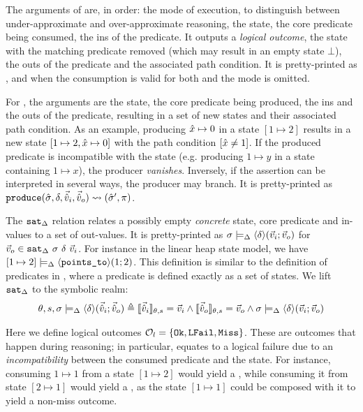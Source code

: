 The arguments of \consume{} are, in order: the mode of execution, to distinguish between under-approximate and over-approximate reasoning, the state, the core predicate being consumed, the ins of the predicate. It outputs a \emph{logical outcome}, the state with the matching predicate removed (which may result in an empty state $\bot$), the outs of the predicate and the associated path condition. It is pretty-printed as , and when the consumption is valid for both \OX{} and \UX{} the mode is omitted.

For \produce{}, the arguments are the state, the core predicate being produced, the ins and the outs of the predicate, resulting in a set of new states and their associated path condition. As an example, producing $\hat{x} \mapsto 0$ in a state $[1 \mapsto 2]$ results in a new state $[1\mapsto 2, \hat{x} \mapsto 0]$ with the path condition $[\hat{x} \neq 1]$. If the produced predicate is incompatible with the state (e.g. producing $1 \mapsto y$ in a state containing $1 \mapsto x$), the producer \emph{vanishes}. Inversely, if the assertion can be interpreted in several ways, the producer may branch. It is pretty-printed as $\texttt{produce}(\hat{\sigma},\delta,\vec{\hat{v}}_i,\vec{\hat{v}}_o)\rightsquigarrow (\hat{\sigma}', \pi)$.

The $\texttt{sat}_{\Delta}$ relation relates a possibly empty \emph{concrete} state, core predicate and in-values to a set of out-values. It is pretty-printed as $\sigma \models_{\Delta} \left<\delta\right>\!(\vec{v}_i;\vec{v}_o)$ for $\vec{v}_o \in \texttt{sat}_{\Delta}~\sigma~\delta~\vec{v}_i$. For instance in the linear heap state model, we have $[ 1 \mapsto 2 ] \models_{\Delta} \left<\texttt{points\_to}\right>\!(1;2)$. This definition is similar to the definition of predicates in \cite{abstractseplogic,localreasoning}, where a predicate is defined exactly as a set of states. We lift $\texttt{sat}_{\Delta}$ to the symbolic realm:
\begin{align*}
	\theta,s,\sigma\models_{\Delta} \left<\delta\right>\!(\vec{\hat{v}}_i;\vec{\hat{v}}_o) \triangleq \llbracket\vec{\hat{v}}_i\rrbracket_{\theta,s}=\vec{v}_i \land \llbracket\vec{\hat{v}}_o\rrbracket_{\theta,s}=\vec{v}_o \land \sigma\models_{\Delta} \left<\delta\right>\!(\vec{v}_i;\vec{v}_o)
\end{align*}

Here we define logical outcomes ${\cal O}_l = \{\texttt{Ok}, \texttt{LFail}, \texttt{Miss} \}$. These are outcomes that happen during reasoning; in particular, \LFail{} equates to a logical failure due to an \emph{incompatibility} between the consumed predicate and the state. For instance, consuming $1 \mapsto 1$ from a state $[1 \mapsto 2]$ would yield a \LFail{}, while consuming it from state $[2 \mapsto 1]$ would yield a \Miss{}, as the state $[1\mapsto 1]$ could be composed with it to yield a non-miss outcome.

